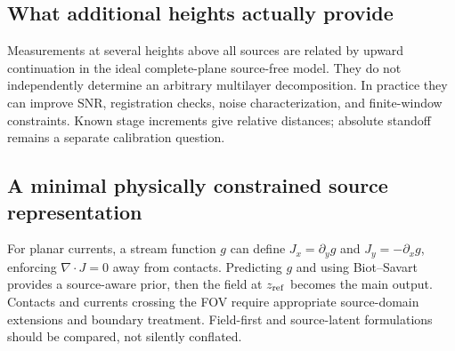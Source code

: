 \subsection{What additional heights actually provide}
Measurements at several heights above all sources are related by upward continuation in the ideal complete-plane source-free model. They do not independently determine an arbitrary multilayer decomposition. In practice they can improve SNR, registration checks, noise characterization, and finite-window constraints. Known stage increments give relative distances; absolute standoff remains a separate calibration question.

\subsection{A minimal physically constrained source representation}
For planar currents, a stream function $g$ can define $J_x=\partial_y g$ and $J_y=-\partial_x g$, enforcing $\nabla\cdot J=0$ away from contacts. Predicting $g$ and using Biot--Savart provides a source-aware prior, then the field at $z_{\rm ref}$ becomes the main output. Contacts and currents crossing the FOV require appropriate source-domain extensions and boundary treatment. Field-first and source-latent formulations should be compared, not silently conflated.

